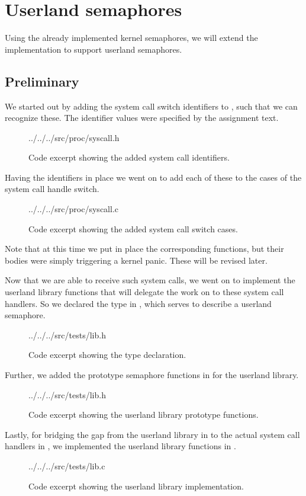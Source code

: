 %
%
%

\section{Userland semaphores}
Using the already implemented kernel semaphores, we will extend the
implementation to support userland semaphores.

\subsection{Preliminary}
We started out by adding the system call switch identifiers to
, such that we can recognize these. The identifier values
were specified by the assignment text.
\begin{figure}[H]
    
    {../../../src/proc/syscall.h}
    \label{code:syscall-identifiers}
    \caption{Code excerpt showing the added system call identifiers.}
\end{figure}
Having the identifiers in place we went on to add each of these to the cases
of the system call handle switch.
\begin{figure}[H]
    
    {../../../src/proc/syscall.c}
    \label{code:syscall-switch}
    \caption{Code excerpt showing the added system call switch cases.}
\end{figure}
Note that at this time we put in place the corresponding functions, but their
bodies were simply triggering a kernel panic. These will be revised later.

Now that we are able to receive such system calls, we went on to implement the
userland library functions that will delegate the work on to these system
call handlers. So we declared the  type in
, which serves to describe a userland semaphore.
\begin{figure}[H]
    
    {../../../src/tests/lib.h}
    \label{code:usr_sem_t}
    \caption{Code excerpt showing the  type declaration.}
\end{figure}
Further, we added the prototype semaphore functions in  for
the userland library.
\begin{figure}[H]
    
    {../../../src/tests/lib.h}
    \label{code:userland-library-prototypes}
    \caption{Code excerpt showing the userland library prototype functions.}
\end{figure}
Lastly, for bridging the gap from the userland library in 
to the actual system call handlers in , we implemented
the userland library functions in .
\begin{figure}[H]
    
    {../../../src/tests/lib.c}
    \label{code:userland-library-implementation}
    \caption{Code excerpt showing the userland library implementation.}
\end{figure}
